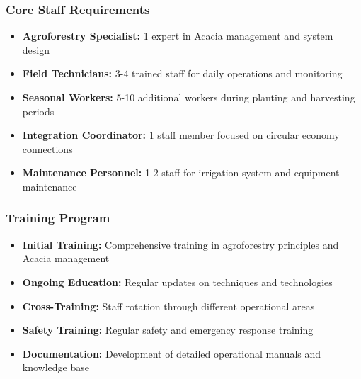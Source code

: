 \subsubsection{Core Staff Requirements}
\begin{itemize}
    \item \textbf{Agroforestry Specialist:} 1 expert in Acacia management and system design
    \item \textbf{Field Technicians:} 3-4 trained staff for daily operations and monitoring
    \item \textbf{Seasonal Workers:} 5-10 additional workers during planting and harvesting periods
    \item \textbf{Integration Coordinator:} 1 staff member focused on circular economy connections
    \item \textbf{Maintenance Personnel:} 1-2 staff for irrigation system and equipment maintenance
\end{itemize}

\subsubsection{Training Program}
\begin{itemize}
    \item \textbf{Initial Training:} Comprehensive training in agroforestry principles and Acacia management
    \item \textbf{Ongoing Education:} Regular updates on techniques and technologies
    \item \textbf{Cross-Training:} Staff rotation through different operational areas
    \item \textbf{Safety Training:} Regular safety and emergency response training
    \item \textbf{Documentation:} Development of detailed operational manuals and knowledge base
\end{itemize}
